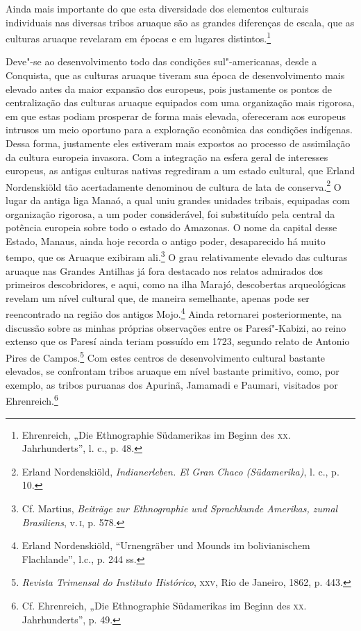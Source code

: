 Ainda mais importante do que esta diversidade dos elementos culturais
individuais nas diversas tribos aruaque são as grandes diferenças de
escala, que as culturas aruaque revelaram em épocas e em lugares
distintos.\footnote{Ehrenreich, „Die Ethnographie Südamerikas im Beginn
  des \textsc{xx}. Jahrhunderts'', l. c., p. 48.}

Deve"-se ao desenvolvimento todo das condições sul"-americanas, desde a
Conquista, que as culturas aruaque tiveram sua época de desenvolvimento
mais elevado antes da maior expansão dos europeus, pois justamente os
pontos de centralização das culturas aruaque equipados com uma
organização mais rigorosa, em que estas podiam prosperar de forma mais
elevada, ofereceram aos europeus intrusos um meio oportuno para a
exploração econômica das condições indígenas. Dessa forma, justamente
eles estiveram mais expostos ao processo de assimilação da cultura
europeia invasora. Com a integração na esfera geral de interesses
europeus, as antigas culturas nativas regrediram a um estado cultural,
que Erland Nordenskiöld tão acertadamente denominou de cultura de lata
de conserva.\footnote{Erland Nordenskiöld, \emph{Indianerleben. El Gran
  Chaco (Südamerika)}, l. c., p. 10.} O lugar da antiga liga Manaó, a
qual uniu grandes unidades tribais, equipadas com organização rigorosa,
a um poder considerável, foi substituído pela central da potência
europeia sobre todo o estado do Amazonas. O nome da capital desse
Estado, Manaus, ainda hoje recorda o antigo poder, desaparecido há muito
tempo, que os Aruaque exibiram ali.\footnote{Cf. Martius, \emph{Beiträge
  zur Ethnographie und Sprachkunde Amerikas, zumal Brasiliens}, v.\,\textsc{i}, p.
  578.} O grau relativamente elevado das culturas aruaque nas Grandes
Antilhas já fora destacado nos relatos admirados dos primeiros
descobridores, e aqui, como na ilha Marajó, descobertas arqueológicas
revelam um nível cultural que, de maneira semelhante, apenas pode ser
reencontrado na região dos antigos Mojo.\footnote{Erland Nordenskiöld,
  ``Urnengräber und Mounds im bolivianischem Flachlande'', l.c., p. 244
  ss.} Ainda retornarei posteriormente, na discussão sobre as minhas
próprias observações entre os Paresí"-Kabizi, ao reino extenso que os
Paresí ainda teriam possuído em 1723, segundo relato de Antonio Pires
de Campos.\footnote{\emph{Revista Trimensal do Instituto Histórico}, \textsc{xxv},
  Rio de Janeiro, 1862, p. 443.} Com estes centros de desenvolvimento
cultural bastante elevados, se confrontam tribos aruaque em nível
bastante primitivo, como, por exemplo, as tribos puruanas dos Apurinã,
Jamamadi e Paumari, visitados por Ehrenreich.\footnote{Cf. Ehrenreich,
  „Die Ethnographie Südamerikas im Beginn des \textsc{xx}. Jahrhunderts'', p.
  49.}

